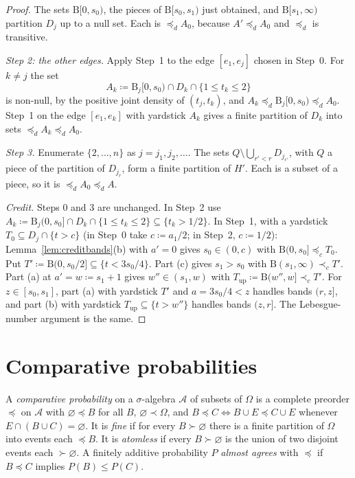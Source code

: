 \documentclass[11pt]{article}
\theoremstyle{definition}\newtheorem{definition}[theorem]{Definition}
\theoremstyle{remark}\newtheorem{remark}[theorem]{Remark}
\newcommand{\Band}{\mathrm{B}}
\begin{document}
\begin{proof}
The sets $\Band[0,s_0)$, the pieces of $\Band[s_0,s_1)$ just obtained, and
$\Band[s_1,\infty)$ partition $D_j$ up to a null set. Each is $\preceq_dA_0$,
because $A'\preceq_dA_0$ and $\preceq_d$ is transitive.

\emph{Step 2: the other edges.} Apply Step~1 to the edge $[e_1,e_j]$ chosen
in Step~0. For $k\ne j$ the set
\[
 A_k\coloneqq\Band_j[0,s_0)\cap D_k\cap\{1\le t_k\le2\}
\]
is non-null, by the positive joint density of $(t_j,t_k)$, and
$A_k\preceq_d\Band_j[0,s_0)\preceq_dA_0$. Step~1 on the edge $[e_1,e_k]$ with
yardstick $A_k$ gives a finite partition of $D_k$ into sets
$\preceq_dA_k\preceq_dA_0$.

\emph{Step 3.} Enumerate $\{2,\dots,n\}$ as $j=j_1,j_2,\dots$. The sets
$Q\setminus\bigcup_{r'<r}D_{j_{r'}}$, with $Q$ a piece of the partition of
$D_{j_r}$, form a finite partition of $H'$. Each is a subset of a piece, so
it is $\preceq_dA_0\preceq_dA$.

\emph{Credit.} Steps 0 and 3 are unchanged. In Step~2 use
$A_k\coloneqq\Band_j(0,s_0]\cap D_k\cap\{1\le t_k\le2\}\subseteq\{t_k>1/2\}$.
In Step~1, with a yardstick $T_0\subseteq D_j\cap\{t>c\}$ (in Step~0 take
$c\coloneqq a_1/2$; in Step~2, $c\coloneqq1/2$): Lemma~\ref{lem:creditbands}(b) with
$a'=0$ gives $s_0\in(0,c)$ with $\Band(0,s_0]\preceq_cT_0$. Put
$T'\coloneqq\Band(0,s_0/2]\subseteq\{t<3s_0/4\}$. Part (c) gives $s_1>s_0$
with $\Band(s_1,\infty)\prec_cT'$. Part (a) at $a'=w\coloneqq s_1+1$ gives
$w''\in(s_1,w)$ with $T_{\mathrm{up}}\coloneqq\Band(w'',w]\prec_cT'$. For
$z\in[s_0,s_1]$, part (a) with yardstick $T'$ and $a=3s_0/4<z$ handles bands
$(r,z]$, and part (b) with yardstick $T_{\mathrm{up}}\subseteq\{t>w''\}$
handles bands $(z,r]$. The Lebesgue-number argument is the same.
\end{proof}

\section{Comparative probabilities}\label{sec:cp}

A \emph{comparative probability} on a $\sigma$-algebra $\mathcal A$ of
subsets of $\Omega$ is a complete preorder $\preceq$ on $\mathcal A$ with
$\varnothing\preceq B$ for all $B$, $\varnothing\prec\Omega$, and
$B\preceq C\iff B\cup E\preceq C\cup E$ whenever $E\cap(B\cup C)=\varnothing$.
It is \emph{fine} if for every $B\succ\varnothing$ there is a finite
partition of $\Omega$ into events each $\preceq B$. It is \emph{atomless} if
every $B\succ\varnothing$ is the union of two disjoint events each
$\succ\varnothing$. A finitely additive probability $P$ \emph{almost agrees}
with $\preceq$ if $B\preceq C$ implies $P(B)\le P(C)$.
\end{document}
